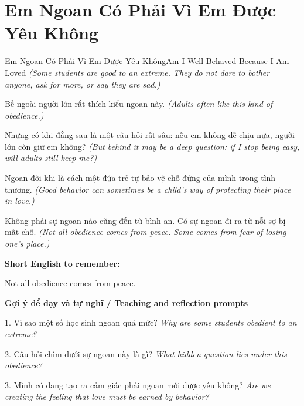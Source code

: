 \section{Em Ngoan Có Phải Vì Em Được Yêu Không}
\begin{truyen}{Em Ngoan Có Phải Vì Em Được Yêu Không}{Am I Well-Behaved Because I Am Loved}
\textit{(Some students are good to an extreme. They do not dare to bother anyone, ask for more, or say they are sad.)}

Bề ngoài người lớn rất thích kiểu ngoan này.
\textit{(Adults often like this kind of obedience.)}

Nhưng có khi đằng sau là một câu hỏi rất sâu: nếu em không dễ chịu nữa, người lớn còn giữ em không?
\textit{(But behind it may be a deep question: if I stop being easy, will adults still keep me?) }

Ngoan đôi khi là cách một đứa trẻ tự bảo vệ chỗ đứng của mình trong tình thương.
\textit{(Good behavior can sometimes be a child's way of protecting their place in love.)}

\end{truyen}

\begin{baihoc}
Không phải sự ngoan nào cũng đến từ bình an. Có sự ngoan đi ra từ nỗi sợ bị mất chỗ.
\textit{(Not all obedience comes from peace. Some comes from fear of losing one's place.)}
\end{baihoc}

\begin{ghinhoanh}
\textbf{Short English to remember:}

Not all obedience comes from peace.

\end{ghinhoanh}

\begin{tuhocnhanh}
\textbf{Gợi ý để dạy và tự nghĩ / Teaching and reflection prompts}

1. Vì sao một số học sinh ngoan quá mức? \textit{Why are some students obedient to an extreme?}

2. Câu hỏi chìm dưới sự ngoan này là gì? \textit{What hidden question lies under this obedience?}

3. Mình có đang tạo ra cảm giác phải ngoan mới được yêu không? \textit{Are we creating the feeling that love must be earned by behavior?}
\end{tuhocnhanh}
\ngancach

